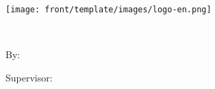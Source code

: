 
\pagestyle{empty}

\begin{center}

\begin{latin}

\texttt{[image: front/template/images/logo-en.png]}

\EnglishThesisUniversity \\
\EnglishThesisDepartment

\begin{large}
\vspace{0.7cm}
\EnglishThesisType


\vspace{1.5cm}

{\Large\textbf\EnglishThesisTitle}

\vspace{1.5cm}

{\normalsize By:}\\
\textbf{\EnglishThesisAuthor}

\vspace{1cm}

{\normalsize Supervisor:}\\ 
\textbf{\EnglishThesisSupervisor}

\end{large}

\vspace{1.5cm}
\EnglishThesisDate

\end{latin}

\end{center}
